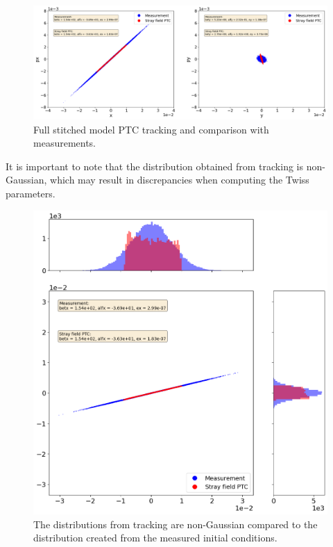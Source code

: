 \begin{figure}[H]
\centering
\includegraphics[width=1.0\textwidth]{02_Simulation/images/full_stitching_PTC.png}
\caption{Full stitched model PTC tracking and comparison with measurements.}
\label{fig:full_stitched_PTC}
\end{figure}

It is important to note that the distribution obtained from tracking is non-Gaussian, which may result in discrepancies when computing the Twiss parameters.

\begin{figure}[H]
\centering
\includegraphics[width=1.0\textwidth]{02_Simulation/images/non_gaussian.png}
\caption{The distributions from tracking are non-Gaussian compared to the distribution created from the measured initial conditions.}
\label{fig:non_gaussian}
\end{figure}

